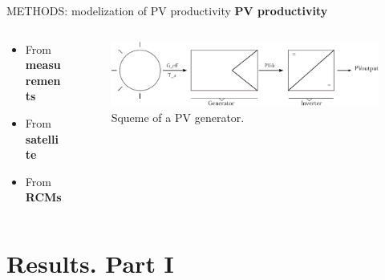 \documentclass{beamer}%
\begin{document}
\begin{frame}[fragile]{METHODS: modelization of PV productivity}
\vspace{0\baselineskip}
\textbf{\alert{PV productivity}}\\
\vspace{1\baselineskip}
{}
\vspace{1\baselineskip}
\begin{columns}
  \begin{column}{0.4\textwidth}
    \small{    \begin{blockalert}\begin{itemize}
    \item From \textbf{measurements}
    \item From \textbf{satellite}
    \item From \textbf{RCMs}  
      \end{itemize}\end{blockalert}}
  \end{column}
  \begin{column}{0.6\textwidth}
    \begin{figure}
      \includegraphics[scale=0.45]{pvsistem.pdf}
      \centering\caption{Squeme of a PV generator.}
    \end{figure}
  \end{column}
\end{columns}
\end{frame}

\section{Results. Part I}
\end{document}
